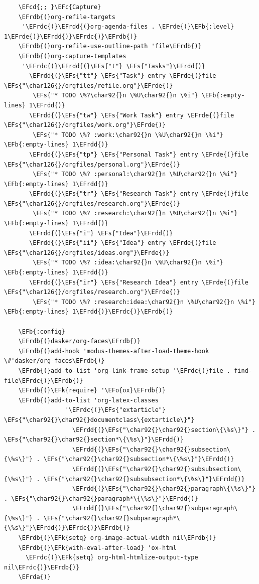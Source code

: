 \documentclass[11pt]{article}
\newcommand{\EFc}[1]{\textcolor{EFc}{#1}} %
\newcommand{\EFcd}[1]{\textcolor{EFcd}{#1}} %
\newcommand{\EFs}[1]{\textcolor{EFs}{#1}} %
\newcommand{\EFk}[1]{\textcolor{EFk}{#1}} %
\newcommand{\EFb}[1]{\textcolor{EFb}{#1}} %
\newcommand{\EFo}[1]{\textcolor{EFo}{#1}} %
\newcommand{\EFrda}[1]{\textcolor{EFrda}{#1}} %
\newcommand{\EFrdb}[1]{\textcolor{EFrdb}{#1}} %
\newcommand{\EFrdc}[1]{\textcolor{EFrdc}{#1}} %
\newcommand{\EFrdd}[1]{\textcolor{EFrdd}{#1}} %
\newcommand{\EFrde}[1]{\textcolor{EFrde}{#1}} %
\begin{document}
\begin{Code}
\begin{Verbatim}
    \EFcd{;; }\EFc{Capture}
    \EFrdb{(}org-refile-targets
     '\EFrdc{(}\EFrdd{(}org-agenda-files . \EFrde{(}\EFb{:level} 1\EFrde{)}\EFrdd{)}\EFrdc{)}\EFrdb{)}
    \EFrdb{(}org-refile-use-outline-path 'file\EFrdb{)}
    \EFrdb{(}org-capture-templates
     '\EFrdc{(}\EFrdd{(}\EFs{"t"} \EFs{"Tasks"}\EFrdd{)}
       \EFrdd{(}\EFs{"tt"} \EFs{"Task"} entry \EFrde{(}file \EFs{"\char126{}/orgfiles/refile.org"}\EFrde{)}
        \EFs{"* TODO \%?\char92{}n \%U\char92{}n \%i"} \EFb{:empty-lines} 1\EFrdd{)}
       \EFrdd{(}\EFs{"tw"} \EFs{"Work Task"} entry \EFrde{(}file \EFs{"\char126{}/orgfiles/work.org"}\EFrde{)}
        \EFs{"* TODO \%? :work:\char92{}n \%U\char92{}n \%i"} \EFb{:empty-lines} 1\EFrdd{)}
       \EFrdd{(}\EFs{"tp"} \EFs{"Personal Task"} entry \EFrde{(}file \EFs{"\char126{}/orgfiles/personal.org"}\EFrde{)}
        \EFs{"* TODO \%? :personal:\char92{}n \%U\char92{}n \%i"} \EFb{:empty-lines} 1\EFrdd{)}
       \EFrdd{(}\EFs{"tr"} \EFs{"Research Task"} entry \EFrde{(}file \EFs{"\char126{}/orgfiles/research.org"}\EFrde{)}
        \EFs{"* TODO \%? :research:\char92{}n \%U\char92{}n \%i"} \EFb{:empty-lines} 1\EFrdd{)}
       \EFrdd{(}\EFs{"i"} \EFs{"Idea"}\EFrdd{)}
       \EFrdd{(}\EFs{"ii"} \EFs{"Idea"} entry \EFrde{(}file \EFs{"\char126{}/orgfiles/ideas.org"}\EFrde{)}
        \EFs{"* TODO \%? :idea:\char92{}n \%U\char92{}n \%i"} \EFb{:empty-lines} 1\EFrdd{)}
       \EFrdd{(}\EFs{"ir"} \EFs{"Research Idea"} entry \EFrde{(}file \EFs{"\char126{}/orgfiles/research.org"}\EFrde{)}
        \EFs{"* TODO \%? :research:idea:\char92{}n \%U\char92{}n \%i"} \EFb{:empty-lines} 1\EFrdd{)}\EFrdc{)}\EFrdb{)}
  
    \EFb{:config}
    \EFrdb{(}dasker/org-faces\EFrdb{)}
    \EFrdb{(}add-hook 'modus-themes-after-load-theme-hook \#'dasker/org-faces\EFrdb{)}
    \EFrdb{(}add-to-list 'org-link-frame-setup '\EFrdc{(}file . find-file\EFrdc{)}\EFrdb{)}
    \EFrdb{(}\EFk{require} '\EFo{ox}\EFrdb{)}
    \EFrdb{(}add-to-list 'org-latex-classes
                 '\EFrdc{(}\EFs{"extarticle"} \EFs{"\char92{}\char92{}documentclass\{extarticle\}"}
                   \EFrdd{(}\EFs{"\char92{}\char92{}section\{\%s\}"} . \EFs{"\char92{}\char92{}section*\{\%s\}"}\EFrdd{)}
                   \EFrdd{(}\EFs{"\char92{}\char92{}subsection\{\%s\}"} . \EFs{"\char92{}\char92{}subsection*\{\%s\}"}\EFrdd{)}
                   \EFrdd{(}\EFs{"\char92{}\char92{}subsubsection\{\%s\}"} . \EFs{"\char92{}\char92{}subsubsection*\{\%s\}"}\EFrdd{)}
                   \EFrdd{(}\EFs{"\char92{}\char92{}paragraph\{\%s\}"} . \EFs{"\char92{}\char92{}paragraph*\{\%s\}"}\EFrdd{)}
                   \EFrdd{(}\EFs{"\char92{}\char92{}subparagraph\{\%s\}"} . \EFs{"\char92{}\char92{}subparagraph*\{\%s\}"}\EFrdd{)}\EFrdc{)}\EFrdb{)}
    \EFrdb{(}\EFk{setq} org-image-actual-width nil\EFrdb{)}
    \EFrdb{(}\EFk{with-eval-after-load} 'ox-html
      \EFrdc{(}\EFk{setq} org-html-htmlize-output-type nil\EFrdc{)}\EFrdb{)}
    \EFrda{)}
\end{Verbatim}
\end{Code}
\end{document}
